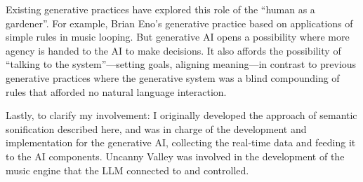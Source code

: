 Existing generative practices have explored this role of the “human as a gardener”. For example, Brian Eno’s generative practice based on applications of simple rules in music looping. But generative AI opens a possibility where more agency is handed to the AI to make decisions. It also affords the possibility of “talking to the system”—setting goals, aligning meaning—in contrast to previous generative practices where the generative system was a blind compounding of rules that afforded no natural language interaction.

Lastly, to clarify my involvement: I originally developed the approach of semantic sonification described here, and was in charge of the development and implementation for the generative AI, collecting the real-time data and feeding it to the AI components. Uncanny Valley was involved in the development of the music engine that the LLM connected to and controlled.







